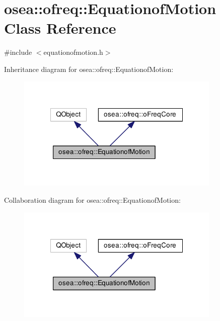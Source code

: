 \hypertarget{classosea_1_1ofreq_1_1_equationof_motion}{\section{osea\-:\-:ofreq\-:\-:Equationof\-Motion Class Reference}
\label{classosea_1_1ofreq_1_1_equationof_motion}
}


{\ttfamily \#include $<$equationofmotion.\-h$>$}



Inheritance diagram for osea\-:\-:ofreq\-:\-:Equationof\-Motion\-:
\nopagebreak
\begin{figure}[H]
\begin{center}
\leavevmode
\includegraphics[width=275pt]{classosea_1_1ofreq_1_1_equationof_motion__inherit__graph}
\end{center}
\end{figure}


Collaboration diagram for osea\-:\-:ofreq\-:\-:Equationof\-Motion\-:
\nopagebreak
\begin{figure}[H]
\begin{center}
\leavevmode
\includegraphics[width=275pt]{classosea_1_1ofreq_1_1_equationof_motion__coll__graph}
\end{center}
\end{figure}
